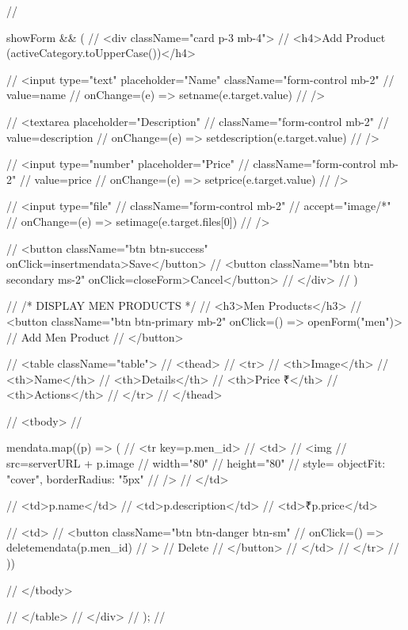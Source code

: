 {//       {showForm && (
//         <div className="card p-3 mb-4">
//           <h4>Add Product ({activeCategory.toUpperCase()})</h4>

//           <input type="text" placeholder="Name" className="form-control mb-2"
//             value={name}
//             onChange={(e) => setname(e.target.value)}
//           />

//           <textarea placeholder="Description"
//             className="form-control mb-2"
//             value={description}
//             onChange={(e) => setdescription(e.target.value)}
//           />

//           <input type="number" placeholder="Price"
//             className="form-control mb-2"
//             value={price}
//             onChange={(e) => setprice(e.target.value)}
//           />

//           <input type="file"
//             className="form-control mb-2"
//             accept="image/*"
//             onChange={(e) => setimage(e.target.files[0])}
//           />

//           <button className="btn btn-success" onClick={insertmendata}>Save</button>
//           <button className="btn btn-secondary ms-2" onClick={closeForm}>Cancel</button>
//         </div>
//       )}

//       {/* DISPLAY MEN PRODUCTS */}
//       <h3>Men Products</h3>
//       <button className="btn btn-primary mb-2" onClick={() => openForm("men")}>
//         Add Men Product
//       </button>

//       <table className="table">
//         <thead>
//           <tr>
//             <th>Image</th>
//             <th>Name</th>
//             <th>Details</th>
//             <th>Price ₹</th>
//             <th>Actions</th>
//           </tr>
//         </thead>

//         <tbody>
//           {mendata.map((p) => (
//             <tr key={p.men_id}>
//               <td>
//                 <img
//                   src={serverURL + p.image}
//                   width="80"
//                   height="80"
//                   style={{ objectFit: "cover", borderRadius: "5px" }}
//                 />
//               </td>

//               <td>{p.name}</td>
//               <td>{p.description}</td>
//               <td>₹{p.price}</td>

//               <td>
//                 <button className="btn btn-danger btn-sm"
//                   onClick={() => deletemendata(p.men_id)}
//                 >
//                   Delete
//                 </button>
//               </td>
//             </tr>
//           ))}
//         </tbody>

//       </table>
//     </div>
//   );
// }

